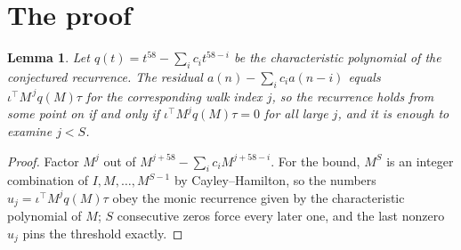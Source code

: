 \documentclass[11pt,a4paper]{article}
\theoremstyle{plain}
\newtheorem{lemma}[theorem]{Lemma}
\theoremstyle{definition}
\begin{document}
\section{The proof}

\begin{lemma}\label{lem:crit}
Let $q(t)=t^{58}-\sum_i c_it^{58-i}$ be the characteristic polynomial of the
conjectured recurrence. The residual $a(n)-\sum_ic_ia(n-i)$ equals
$\iota^{\!\top}M^{\,j}q(M)\tau$ for the corresponding walk index $j$, so the recurrence
holds from some point on if and only if $\iota^{\!\top}M^{j}q(M)\tau=0$ for all large $j$,
and it is enough to examine $j<S$.
\end{lemma}

\begin{proof}
Factor $M^{j}$ out of $M^{j+58}-\sum_ic_iM^{j+58-i}$. For the bound, $M^{S}$
is an integer combination of $I,M,\dots,M^{S-1}$ by Cayley--Hamilton, so the numbers
$u_j=\iota^{\!\top}M^{j}q(M)\tau$ obey the monic recurrence given by the characteristic
polynomial of $M$; $S$ consecutive zeros force every later one, and the last nonzero $u_j$
pins the threshold exactly.
\end{proof}
\end{document}
